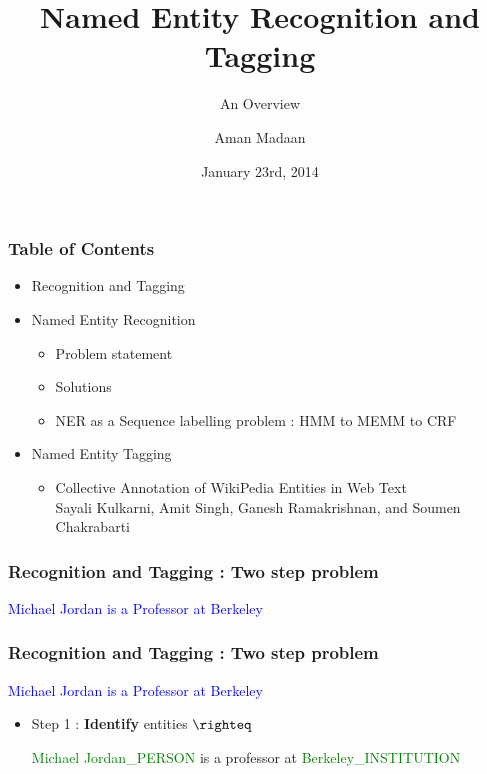 \documentclass{beamer}
\title{Named Entity Recognition and Tagging}
\subtitle{An Overview}
\author[A. Madaan]{Aman Madaan}
\institute[IITB]{
  Indian Institute of Technology Bombay, Mumbai
}
\date{January 23rd, 2014}
\begin{document}
\maketitle

\begin{frame}
\frametitle{Table of Contents}
\tableofcontents[currentsection]
\begin{itemize}
  \item Recognition and Tagging
  \item Named Entity Recognition \bigskip
    \begin{itemize}
      \item Problem statement \bigskip
      \item Solutions \bigskip
      \item NER as a Sequence labelling problem : HMM to MEMM to CRF
    \end{itemize}
\bigskip
  \item Named Entity Tagging \bigskip
    \begin{itemize}
      \item 
      Collective Annotation of WikiPedia Entities in Web Text \\ Sayali Kulkarni, Amit Singh, Ganesh Ramakrishnan, and Soumen Chakrabarti
    \end{itemize}
\end{itemize}
\end{frame}

\begin{frame}
 \frametitle{Recognition and Tagging : Two step problem}
 \begin{center}
\textcolor{blue}{Michael Jordan is a Professor at Berkeley}
   \end{center}

\end{frame}

\begin{frame}
 \frametitle{Recognition and Tagging : Two step problem}
 \begin{center}
\textcolor{blue}{Michael Jordan is a Professor at Berkeley}
   \end{center}

 \begin{itemize}  
  \item Step 1 : \textbf{Identify} entities $\righteq$ 

  \medskip
  \textcolor{green}{Michael Jordan\_PERSON} is a professor at \textcolor{green}{Berkeley\_INSTITUTION} \medskip
  
\end{itemize}
\end{frame}
\end{document}
